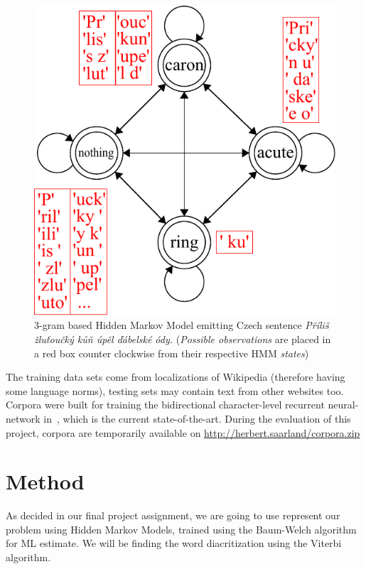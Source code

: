 \documentclass[12pt]{article}
\begin{document}
    \begin{figure}[!b]
        \centering
        \includegraphics{automata.pdf}
        \caption{3-gram based Hidden Markov Model emitting Czech sentence
        \textit{P\v{r}\'{i}li\v{s} \v{z}lu\v{t}ou\v{c}k\'{y}  k\r{u}\v{n} \'up\v{e}l \v{d}\'{a}belsk\'{e} {\'{o}dy.}}
        (\textit{Possible observations} are placed in a red box counter clockwise from their respective HMM \textit{states})}

        \label{fig:auto}
    \end{figure}
    The training data sets come from localizations of Wikipedia (therefore having some language norms),
    testing sets may contain text from other websites too.
    Corpora were built for training the bidirectional character-level recurrent neural-network in~\cite{naplava},
    which is the current state-of-the-art. During the evaluation of this project, corpora are temporarily available on \url{http://herbert.saarland/corpora.zip}

    \section{Method}\label{sec:method}
    As decided in our final project assignment, we are going to use represent our problem using Hidden Markov Models,
    trained using the Baum-Welch algorithm for ML estimate.
    We will be finding the word diacritization using the Viterbi algorithm.
\end{document}
